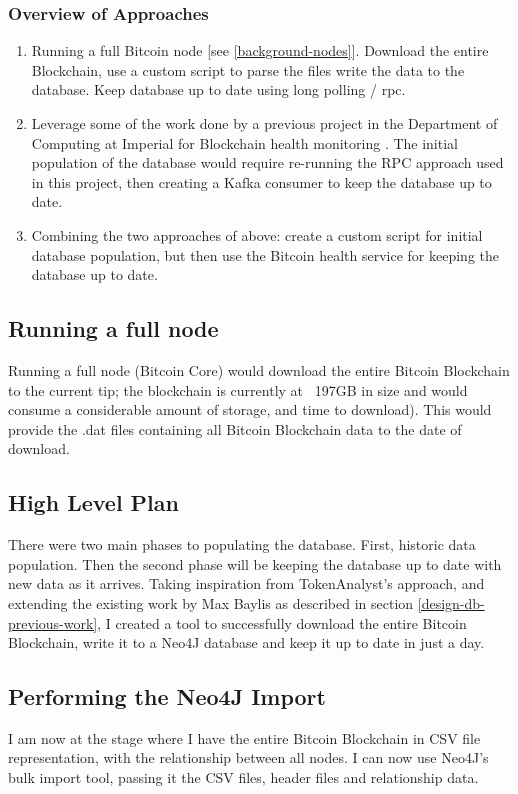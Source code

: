 \subsubsection{Overview of Approaches}
\begin{enumerate}
    \item Running a full Bitcoin node [see \ref{background-nodes}]. Download the entire Blockchain, use a custom script to parse the files write the data to the database. Keep database up to date using long polling / \gls{rpc}. 
    \item Leverage some of the work done by a previous project in the Department of Computing at Imperial for Blockchain health monitoring \cite{RefWorks:doc:5c6bd151e4b041254f892045}. The initial population of the database would require re-running the RPC approach used in this project, then creating a Kafka consumer to keep the database up to date. 
    \item Combining the two approaches of above: create a custom script for initial database population, but then use the Bitcoin health service for keeping the database up to date. 
\end{enumerate}


\subsection{Running a full node}
Running a full node (Bitcoin Core) would download the entire Bitcoin Blockchain to the current tip; the blockchain is currently at ~197GB\cite{RefWorks:doc:5c6ab1a3e4b05e3aaec0ffc8} in size and would consume a considerable amount of storage, and time to download). This would provide the .dat files containing all Bitcoin Blockchain data to the date of download. 

\subsection{High Level Plan}
There were two main phases to populating the database. First, historic data population. Then the second phase will be keeping the database up to date with new data as it arrives. Taking inspiration from TokenAnalyst's approach, and extending the existing work by Max Baylis as described in section \ref{design-db-previous-work}, I created a tool to successfully download the entire Bitcoin Blockchain, write it to a Neo4J database and keep it up to date in just a day.



\subsection{Performing the Neo4J Import}
I am now at the stage where I have the entire Bitcoin Blockchain in CSV file representation, with the relationship between all nodes. I can now use Neo4J's bulk import tool, passing it the CSV files, header files and relationship data. 

